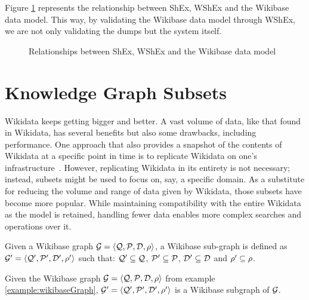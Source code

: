 Figure \ref{fig:WShEx} represents the relationship between ShEx, WShEx and the Wikibase data model. This way, by validating the Wikibase data model through WShEx, we are not only validating the dumps but the system itself.

\begin{figure}[ht]
    \centering
    
    \caption[Relationships between ShEx, WShEx and the Wikibase data model]{Relationships between ShEx, WShEx and the Wikibase data model~\cite{https://doi.org/10.48550/arxiv.2110.11709}}
    \label{fig:WShEx}
\end{figure}

\section{Knowledge Graph Subsets}

Wikidata keeps getting bigger and better. A vast volume of data, like that found in Wikidata, has several benefits but also some drawbacks, including performance. One approach that also provides a snapshot of the contents of Wikidata at a specific point in time is to replicate Wikidata on one's infrastructure~\cite{10.37044/osf.io/wu9et}. However, replicating Wikidata in its entirety is not necessary; instead, subsets might be used to focus on, say, a specific domain. As a substitute for reducing the volume and range of data given by Wikidata, those subsets have become more popular. While maintaining compatibility with the entire Wikidata as the model is retained, handling fewer data enables more complex searches and operations over it.

\begin{definition}
    Given a Wikibase graph $\mathcal{G}=\langle\mathcal{Q},\mathcal{P},\mathcal{D},\rho\rangle$, a Wikibase sub-graph is defined as  $\mathcal{G}'=\langle\mathcal{Q}',\mathcal{P}',\mathcal{D}',\rho'\rangle$ such that: $\mathcal{Q}'\subseteq\mathcal{Q}$, $\mathcal{P}'\subseteq\mathcal{P}$, $\mathcal{D}'\subseteq\mathcal{D}$ and $\rho'\subseteq\rho$.
\end{definition}

\begin{example}
    Given the Wikibase graph $\mathcal{G}=\langle\mathcal{Q},\mathcal{P},\mathcal{D},\rho\rangle$ from example \ref{example:wikibaseGraph}, $\mathcal{G}'=\langle\mathcal{Q}',\mathcal{P}',\mathcal{D}',\rho'\rangle$ is a Wikibase subgraph of $\mathcal{G}$.
\end{example}

